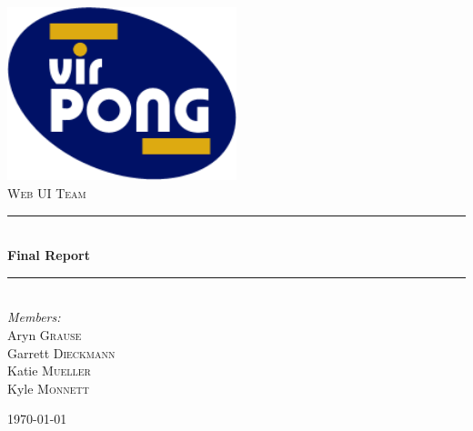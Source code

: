 %

\newcommand{\HRule}{\rule{\linewidth}{0.5mm}}

\begin{titlepage}
	\begin{center}

		\includegraphics[width=0.50\textwidth]{./logo.png}
		\\[1cm]

		\textsc{\LARGE Web UI Team}\\[1.5cm]

		\HRule \\[0.4cm]
			{\Huge \bfseries Final Report}\\[0.4cm]
		\HRule \\[1.5cm]

		\emph{Members:}\\
		Aryn \textsc{Grause}\\
		Garrett \textsc{Dieckmann}\\
		Katie \textsc{Mueller}\\
		Kyle \textsc{Monnett}\\
		
		\vfill

		{\large \today}
		
	\end{center}
\end{titlepage}